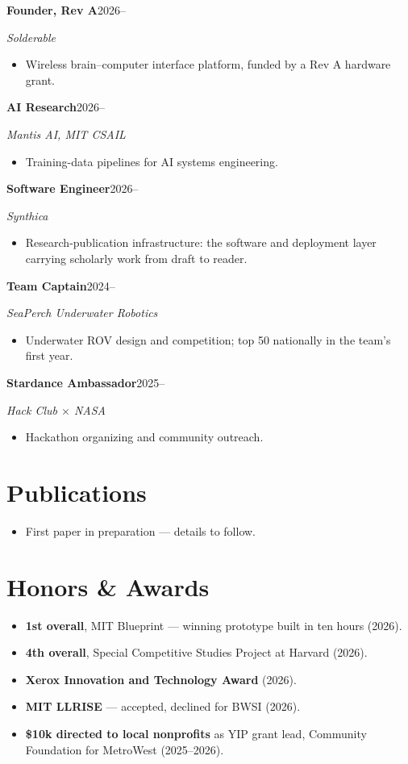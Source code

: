 \documentclass[10pt,letterpaper]{article}
\newcommand{\entry}[2]{%
  \vspace{2pt}%
  \noindent\textbf{#1}\hfill{\footnotesize #2}\par
}
\newcommand{\where}[1]{{\footnotesize\itshape #1}\par\vspace{1pt}}
\begin{document}
\entry{Founder, Rev A}{2026--}
\where{Solderable}
\begin{itemize}
  \item Wireless brain--computer interface platform, funded by a Rev A hardware grant.
\end{itemize}

\entry{AI Research}{2026--}
\where{Mantis AI, MIT CSAIL}
\begin{itemize}
  \item Training-data pipelines for AI systems engineering.
\end{itemize}

\entry{Software Engineer}{2026--}
\where{Synthica}
\begin{itemize}
  \item Research-publication infrastructure: the software and deployment layer
        carrying scholarly work from draft to reader.
\end{itemize}

\entry{Team Captain}{2024--}
\where{SeaPerch Underwater Robotics}
\begin{itemize}
  \item Underwater ROV design and competition; top 50 nationally in the team's first year.
\end{itemize}

\entry{Stardance Ambassador}{2025--}
\where{Hack Club $\times$ NASA}
\begin{itemize}
  \item Hackathon organizing and community outreach.
\end{itemize}

\section{Publications}
\begin{itemize}
  \item First paper in preparation --- details to follow.
\end{itemize}

\section{Honors \& Awards}
\begin{itemize}
  \item \textbf{1st overall}, MIT Blueprint --- winning prototype built in ten hours (2026).
  \item \textbf{4th overall}, Special Competitive Studies Project at Harvard (2026).
  \item \textbf{Xerox Innovation and Technology Award} (2026).
  \item \textbf{MIT LLRISE} --- accepted, declined for BWSI (2026).
  \item \textbf{\$10k directed to local nonprofits} as YIP grant lead,
        Community Foundation for MetroWest (2025--2026).
\end{itemize}
\end{document}
